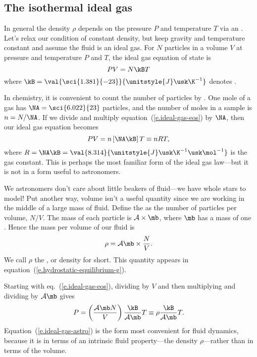 \subsection{The isothermal ideal gas}\label{s.ideal-gas}

In general the density $\rho$ depends on the pressure $P$ and temperature $T$ via an . Let's relax our condition of constant density, but keep gravity and temperature constant and assume the fluid is an ideal gas. For $N$ particles in a volume $V$ at pressure and temperature $P$ and $T$, the ideal gas equation of state is
\begin{equation}\label{e.ideal-gas-eos}
PV = N\kB T
\end{equation}
where $\kB = \val{\sci{1.381}{-23}}{\unitstyle{J}\usk\K^{-1}}$ denotes .

In chemistry, it is convenient to count the number of particles by .  One mole of a gas has $\NA = \sci{6.022}{23}$ particles, and the number of moles in a sample is $n = N/\NA$.  If we divide and multiply equation~(\ref{e.ideal-gas-eos}) by $\NA$, then our ideal gas equation becomes
\[ PV = n\left[\NA \kB\right]T \equiv n R T, \]
where $R = \NA\kB = \val{8.314}{\unitstyle{J}\usk\K^{-1}\usk\mol^{-1}}$ is the gas constant. This is perhaps the most familiar form of the ideal gas law---but it is not in a form useful to astronomers.

We astronomers don't care about little beakers of fluid---we have whole stars to model! Put another way, volume isn't a useful quantity since we are working in the middle of a large mass of fluid. Define the  as the number of particles per volume, $N/V$. The mass of each particle is $\mathcal{A}\times\mb$, where $\mb$ has a mass of one . Hence the mass per volume of our fluid is
\[
	\rho = \mathcal{A}\mb \times\frac{N}{V}.
\]
We call $\rho$ the , or density for short. This quantity appears in equation~(\ref{e.hydrostatic-equilibrium-g}).

Starting with eq.~(\ref{e.ideal-gas-eos}), dividing by $V$ and then multiplying and dividing by $\mathcal{A}\mb$ gives
\begin{equation}\label{e.ideal-gas-astro}
 P = \left(\frac{\mathcal{A}\mb N}{V}\right)\frac{\kB}{\mathcal{A}\mb} T \equiv \rho \frac{\kB}{\mathcal{A}\mb} T.
\end{equation}
Equation~(\ref{e.ideal-gas-astro}) is the form most convenient for fluid dynamics, because it is in terms of an intrinsic fluid property---the density $\rho$---rather than in terms of the volume.

